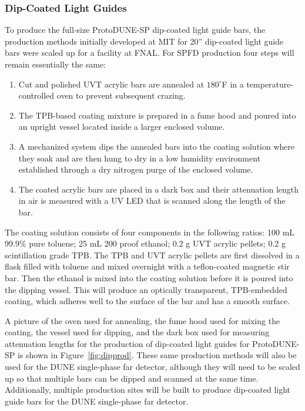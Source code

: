 \subsubsection{Dip-Coated Light Guides}
\label{ssec:fdsp-pd-pc-prod-bar1}

To produce the full-size ProtoDUNE-SP  dip-coated light guide bars, the production methods initially developed at MIT for 20'' dip-coated light guide bars were scaled up for a facility at FNAL. For SPFD production four steps will remain essentially the same:

\begin{enumerate}
\item Cut and polished UVT acrylic bars are annealed at $180^{\circ}$F in a temperature-controlled oven to prevent subsequent crazing.
\item The TPB-based coating mixture is prepared in a fume hood and poured into an upright vessel located inside a larger enclosed volume.
\item A mechanized system dips the annealed bars into the coating solution where they soak and are then hung to dry in a low humidity environment established through a dry nitrogen purge of the enclosed volume.
\item The coated acrylic bars are placed in a dark box and their attenuation length in air is measured with a UV LED that is scanned along the length of the bar.
\end{enumerate}

The coating solution consists of four components in the following ratios: 100 mL 99.9\% pure toluene; 25 mL 200 proof ethanol; 0.2 g UVT acrylic pellets; 0.2 g scintillation grade TPB. The TPB and UVT acrylic pellets are first dissolved in a flask filled with toluene and mixed overnight with a teflon-coated magnetic stir bar.  Then the ethanol is mixed into the coating solution before it is poured into the dipping vessel.  This will produce an optically transparent, TPB-embedded coating, which adheres well to the surface of the bar and has a smooth surface.

A picture of the oven used for annealing, the fume hood used for mixing the coating, the vessel used for dipping, and the dark box used for measuring attenuation lengths for the production of dip-coated light guides for ProtoDUNE-SP is shown in Figure~\ref{fig:dipprod}.  These same production methods will also be used for the DUNE single-phase far detector, although they will need to be scaled up so that multiple bars can be dipped and scanned at the same time.  Additionally, multiple production sites will be built to produce dip-coated light guide bars for the DUNE single-phase far detector.

